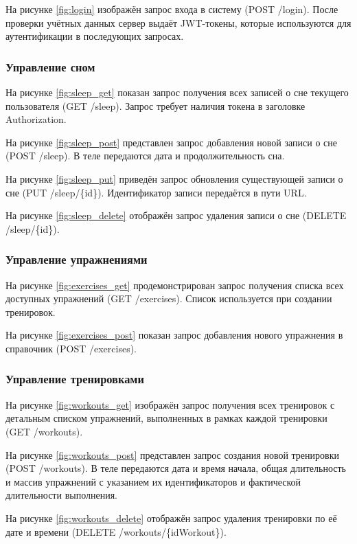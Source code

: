 На рисунке \ref{fig:login} изображён запрос входа в систему (POST /login). После проверки учётных данных сервер выдаёт JWT-токены, которые используются для аутентификации в последующих запросах.

\subsubsection{Управление сном}

На рисунке \ref{fig:sleep_get} показан запрос получения всех записей о сне текущего пользователя (GET /sleep). Запрос требует наличия токена в заголовке Authorization.

На рисунке \ref{fig:sleep_post} представлен запрос добавления новой записи о сне (POST /sleep). В теле передаются дата и продолжительность сна.

На рисунке \ref{fig:sleep_put} приведён запрос обновления существующей записи о сне (PUT /sleep/\{id\}). Идентификатор записи передаётся в пути URL.

На рисунке \ref{fig:sleep_delete} отображён запрос удаления записи о сне (DELETE /sleep/\{id\}).

\subsubsection{Управление упражнениями}

На рисунке \ref{fig:exercises_get} продемонстрирован запрос получения списка всех доступных упражнений (GET /exercises). Список используется при создании тренировок.

На рисунке \ref{fig:exercises_post} показан запрос добавления нового упражнения в справочник (POST /exercises).

\subsubsection{Управление тренировками}

На рисунке \ref{fig:workouts_get} изображён запрос получения всех тренировок с детальным списком упражнений, выполненных в рамках каждой тренировки (GET /workouts).

На рисунке \ref{fig:workouts_post} представлен запрос создания новой тренировки (POST /workouts). В теле передаются дата и время начала, общая длительность и массив упражнений с указанием их идентификаторов и фактической длительности выполнения.

На рисунке \ref{fig:workouts_delete} отображён запрос удаления тренировки по её дате и времени (DELETE /workouts/\{idWorkout\}).

